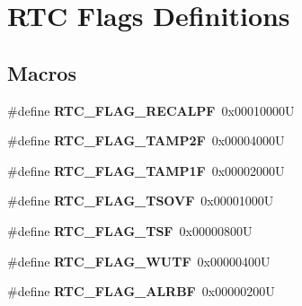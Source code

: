 \hypertarget{group___r_t_c___flags___definitions}{}\section{R\+TC Flags Definitions}
\label{group___r_t_c___flags___definitions}
\subsection*{Macros}
\begin{DoxyCompactItemize}
\item 
\mbox{\label{group___r_t_c___flags___definitions_ga01cba90a7ca51a928f72d28b6fe0d2ac}} 
\#define {\bfseries R\+T\+C\+\_\+\+F\+L\+A\+G\+\_\+\+R\+E\+C\+A\+L\+PF}~0x00010000U
\item 
\mbox{\label{group___r_t_c___flags___definitions_ga5ca385acdd6a179336d4ce661dd02137}} 
\#define {\bfseries R\+T\+C\+\_\+\+F\+L\+A\+G\+\_\+\+T\+A\+M\+P2F}~0x00004000U
\item 
\mbox{\label{group___r_t_c___flags___definitions_ga3abf1af75c6ae88ddabe4b8a26634f99}} 
\#define {\bfseries R\+T\+C\+\_\+\+F\+L\+A\+G\+\_\+\+T\+A\+M\+P1F}~0x00002000U
\item 
\mbox{\label{group___r_t_c___flags___definitions_ga74656ea8ff41be61a3734dc27367e039}} 
\#define {\bfseries R\+T\+C\+\_\+\+F\+L\+A\+G\+\_\+\+T\+S\+O\+VF}~0x00001000U
\item 
\mbox{\label{group___r_t_c___flags___definitions_ga9b9ac7de7718bfe0ff77e1fd1193744b}} 
\#define {\bfseries R\+T\+C\+\_\+\+F\+L\+A\+G\+\_\+\+T\+SF}~0x00000800U
\item 
\mbox{\label{group___r_t_c___flags___definitions_gafcadab331b0193e82c7f6b037044f194}} 
\#define {\bfseries R\+T\+C\+\_\+\+F\+L\+A\+G\+\_\+\+W\+U\+TF}~0x00000400U
\item 
\mbox{\label{group___r_t_c___flags___definitions_gabb7bd65e83b346f42e28091ef1e643f5}} 
\#define {\bfseries R\+T\+C\+\_\+\+F\+L\+A\+G\+\_\+\+A\+L\+R\+BF}~0x00000200U

\end{DoxyCompactItemize}
